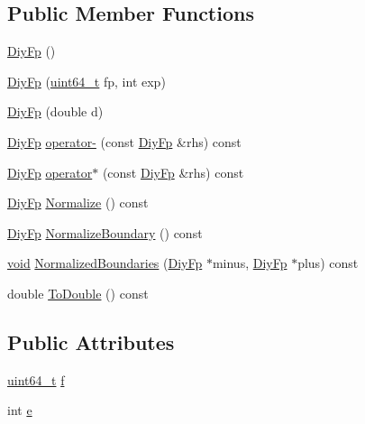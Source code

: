 \subsection*{Public Member Functions}
\begin{DoxyCompactItemize}
\item 
\hyperlink{structinternal_1_1DiyFp_aea27f027c58a55245d700df08be4ff7e}{Diy\+Fp} ()
\item 
\hyperlink{structinternal_1_1DiyFp_a9a8f2f5c49dfa0dee4a527f0829cc2e5}{Diy\+Fp} (\hyperlink{stdint_8h_aec6fcb673ff035718c238c8c9d544c47}{uint64\+\_\+t} fp, int exp)
\item 
\hyperlink{structinternal_1_1DiyFp_adc132c7da4c8e3ee5ae12efdcf6dbf7c}{Diy\+Fp} (double d)
\item 
\hyperlink{structinternal_1_1DiyFp}{Diy\+Fp} \hyperlink{structinternal_1_1DiyFp_a9cea201daabec04c6f2526b35af8ead3}{operator-\/} (const \hyperlink{structinternal_1_1DiyFp}{Diy\+Fp} \&rhs) const
\item 
\hyperlink{structinternal_1_1DiyFp}{Diy\+Fp} \hyperlink{structinternal_1_1DiyFp_a9868841f824924cc385ad5163c9c85b3}{operator$\ast$} (const \hyperlink{structinternal_1_1DiyFp}{Diy\+Fp} \&rhs) const
\item 
\hyperlink{structinternal_1_1DiyFp}{Diy\+Fp} \hyperlink{structinternal_1_1DiyFp_aa6cbacc8dfcd92cb8c57884e45548976}{Normalize} () const
\item 
\hyperlink{structinternal_1_1DiyFp}{Diy\+Fp} \hyperlink{structinternal_1_1DiyFp_a3a840e739b412e20e11c05a03f4573df}{Normalize\+Boundary} () const
\item 
\hyperlink{imgui__impl__opengl3__loader_8h_ac668e7cffd9e2e9cfee428b9b2f34fa7}{void} \hyperlink{structinternal_1_1DiyFp_adef8bf723f24db9dc6cefa260e8c2390}{Normalized\+Boundaries} (\hyperlink{structinternal_1_1DiyFp}{Diy\+Fp} $\ast$minus, \hyperlink{structinternal_1_1DiyFp}{Diy\+Fp} $\ast$plus) const
\item 
double \hyperlink{structinternal_1_1DiyFp_acf0e7974f0a1175ae04edf8e4a7d1319}{To\+Double} () const
\end{DoxyCompactItemize}
\subsection*{Public Attributes}
\begin{DoxyCompactItemize}
\item 
\hyperlink{stdint_8h_aec6fcb673ff035718c238c8c9d544c47}{uint64\+\_\+t} \hyperlink{structinternal_1_1DiyFp_a09b9217a86e8a2e6aa8d2d48fc351008}{f}
\item 
int \hyperlink{structinternal_1_1DiyFp_afa9db335eeb61c7f966d888d89b1e6f2}{e}
\end{DoxyCompactItemize}

